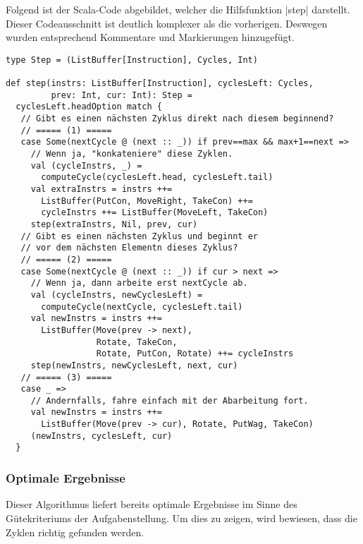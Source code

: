 Folgend ist der Scala-Code abgebildet, welcher die Hilfsfunktion |step| darstellt.
Dieser Codeausschnitt ist deutlich komplexer als die vorherigen. Deswegen wurden entsprechend Kommentare und Markierungen hinzugefügt.
\lstset{basicstyle=\ttfamily}
\begin{lstlisting}
type Step = (ListBuffer[Instruction], Cycles, Int)

def step(instrs: ListBuffer[Instruction], cyclesLeft: Cycles,
         prev: Int, cur: Int): Step =
  cyclesLeft.headOption match {
   // Gibt es einen nächsten Zyklus direkt nach diesem beginnend?
   // ===== (1) =====
   case Some(nextCycle @ (next :: _)) if prev==max && max+1==next =>
     // Wenn ja, "konkateniere" diese Zyklen.
     val (cycleInstrs, _) =
       computeCycle(cyclesLeft.head, cyclesLeft.tail)
     val extraInstrs = instrs ++=
       ListBuffer(PutCon, MoveRight, TakeCon) ++=
       cycleInstrs ++= ListBuffer(MoveLeft, TakeCon)
     step(extraInstrs, Nil, prev, cur)
   // Gibt es einen nächsten Zyklus und beginnt er
   // vor dem nächsten Elementn dieses Zyklus?
   // ===== (2) =====
   case Some(nextCycle @ (next :: _)) if cur > next =>
     // Wenn ja, dann arbeite erst nextCycle ab.
     val (cycleInstrs, newCyclesLeft) =
       computeCycle(nextCycle, cyclesLeft.tail)
     val newInstrs = instrs ++=
       ListBuffer(Move(prev -> next),
                  Rotate, TakeCon,
                  Rotate, PutCon, Rotate) ++= cycleInstrs
     step(newInstrs, newCyclesLeft, next, cur)
   // ===== (3) =====
   case _ =>
     // Andernfalls, fahre einfach mit der Abarbeitung fort.
     val newInstrs = instrs ++=
       ListBuffer(Move(prev -> cur), Rotate, PutWag, TakeCon)
     (newInstrs, cyclesLeft, cur)
  }
\end{lstlisting}
\lstset{basicstyle=\ttfamily}

\subsubsection{Optimale Ergebnisse}
\label{opt_res}
Dieser Algorithmus liefert bereits optimale Ergebnisse im Sinne des Güte\-kri\-ter\-iums der Aufgabenstellung.
Um dies zu zeigen, wird bewiesen, dass die Zyklen richtig gefunden werden.
